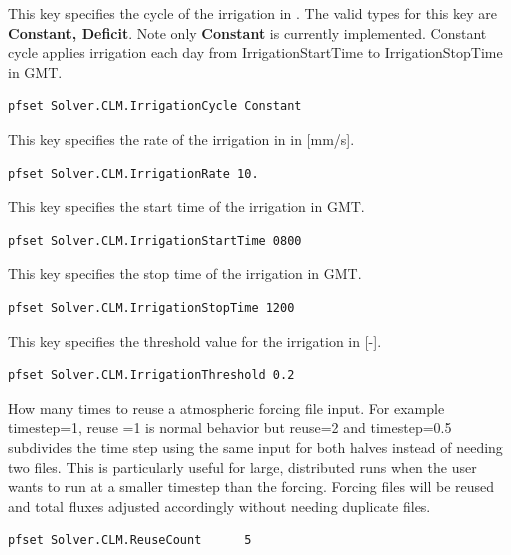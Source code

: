 {This key specifies the cycle of the irrigation in .  The valid types for this key are {\bf Constant, Deficit}. Note only {\bf Constant} is currently implemented.  Constant cycle applies irrigation each day from IrrigationStartTime to IrrigationStopTime in GMT.
}
\begin{display}\begin{verbatim}
pfset Solver.CLM.IrrigationCycle Constant
\end{verbatim}\end{display}

{This key specifies the rate of the irrigation in  in [mm/s].
}
\begin{display}\begin{verbatim}
pfset Solver.CLM.IrrigationRate 10.
\end{verbatim}\end{display}

{This key specifies the start time of the irrigation in  GMT.
}
\begin{display}\begin{verbatim}
pfset Solver.CLM.IrrigationStartTime 0800
\end{verbatim}\end{display}

{This key specifies the stop time of the irrigation in  GMT.
}
\begin{display}\begin{verbatim}
pfset Solver.CLM.IrrigationStopTime 1200
\end{verbatim}\end{display}

{This key specifies the threshold value for the irrigation in  [-].
}
\begin{display}\begin{verbatim}
pfset Solver.CLM.IrrigationThreshold 0.2
\end{verbatim}\end{display}

{How many times to reuse a  atmospheric forcing file input. For example timestep=1,
reuse =1 is normal behavior but reuse=2 and timestep=0.5 subdivides
the time step using the same  input for both halves instead of needing two files.
This is particularly useful for large, distributed runs when the user wants to run \parflow{}
at a smaller timestep than the  forcing.  Forcing files will be reused and
total fluxes adjusted accordingly without needing duplicate files.}
\begin{display}\begin{verbatim}
pfset Solver.CLM.ReuseCount      5
\end{verbatim}\end{display}

